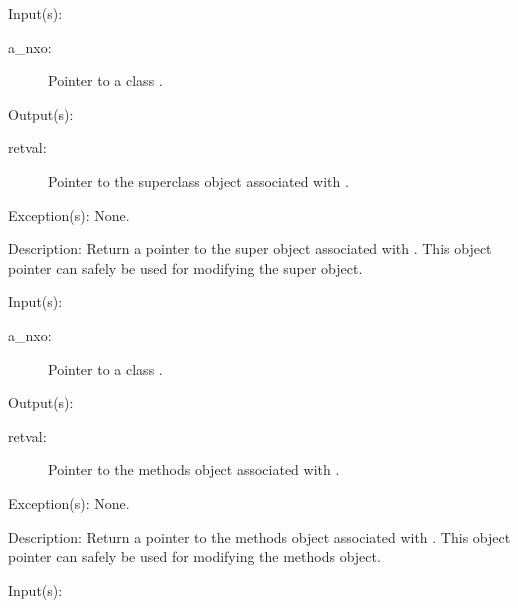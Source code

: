 \begin{capi}
\begin{capilist}
	\item[Input(s): ]
		\begin{description}\item[]
		\item[a\_nxo: ]
			Pointer to a class .
		\end{description}
	\item[Output(s): ]
		\begin{description}\item[]
		\item[retval: ]
			Pointer to the superclass object associated with
			.
		\end{description}
	\item[Exception(s): ] None.
	\item[Description: ]
		Return a pointer to the super object associated with
		.  This object pointer can safely be used for
		modifying the super object.
	\end{capilist}
\label{nxo_class_methods_get}
	\begin{capilist}
	\item[Input(s): ]
		\begin{description}\item[]
		\item[a\_nxo: ]
			Pointer to a class .
		\end{description}
	\item[Output(s): ]
		\begin{description}\item[]
		\item[retval: ]
			Pointer to the methods object associated with
			.
		\end{description}
	\item[Exception(s): ] None.
	\item[Description: ]
		Return a pointer to the methods object associated with
		.  This object pointer can safely be used for
		modifying the methods object.
	\end{capilist}
\label{nxo_class_data_get}
	\begin{capilist}
	\item[Input(s): ]
		\begin{description}\item[]

\end{description}
\end{capilist}
\end{capi}

